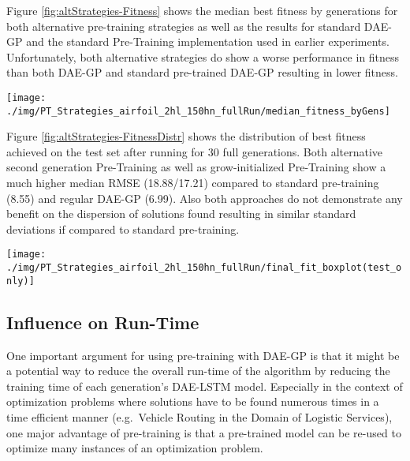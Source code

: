 \documentclass[
  11pt,
]{article}
\let\origfigure\figure
\let\endorigfigure\endfigure
\renewenvironment{figure}[1][2] {
    \expandafter\origfigure\expandafter[H]
} {
    \endorigfigure
}
\begin{document}
Figure \ref{fig:altStrategies-Fitness} shows the median best fitness by generations for both alternative pre-training strategies as well as the results for standard DAE-GP and the standard Pre-Training implementation used in earlier experiments. Unfortunately, both alternative strategies do show a worse performance in fitness than both DAE-GP and standard pre-trained DAE-GP resulting in lower fitness.

\begin{figure}[c]

{\centering \texttt{[image: ./img/PT\_Strategies\_airfoil\_2hl\_150hn\_fullRun/median\_fitness\_byGens]} 

}

\caption{Best Fitness over 30 Generations - Airfoil - Alternative Pre-Training Strategies }\label{fig:altStrategies-Fitness}
\end{figure}

Figure \ref{fig:altStrategies-FitnessDistr} shows the distribution of best fitness achieved on the test set after running for 30 full generations. Both alternative second generation Pre-Training as well as grow-initialized Pre-Training show a much higher median RMSE (18.88/17.21) compared to standard pre-training (8.55) and regular DAE-GP (6.99). Also both approaches do not demonstrate any benefit on the dispersion of solutions found resulting in similar standard deviations if compared to standard pre-training.

\begin{figure}[c]

{\centering \texttt{[image: ./img/PT\_Strategies\_airfoil\_2hl\_150hn\_fullRun/final\_fit\_boxplot(test\_only)]} 

}

\caption{Best Fitness on Test Set after 30 Generations - Airfoil - Alternative Pre-Training Strategies}\label{fig:altStrategies-FitnessDistr}
\end{figure}

\hypertarget{influence-on-run-time}{%
\subsection{Influence on Run-Time}\label{influence-on-run-time}}

One important argument for using pre-training with DAE-GP is that it might be a potential way to reduce the overall run-time of the algorithm by reducing the training time of each generation's DAE-LSTM model. Especially in the context of optimization problems where solutions have to be found numerous times in a time efficient manner (e.g.~Vehicle Routing in the Domain of Logistic Services), one major advantage of pre-training is that a pre-trained model can be re-used to optimize many instances of an optimization problem.
\end{document}
